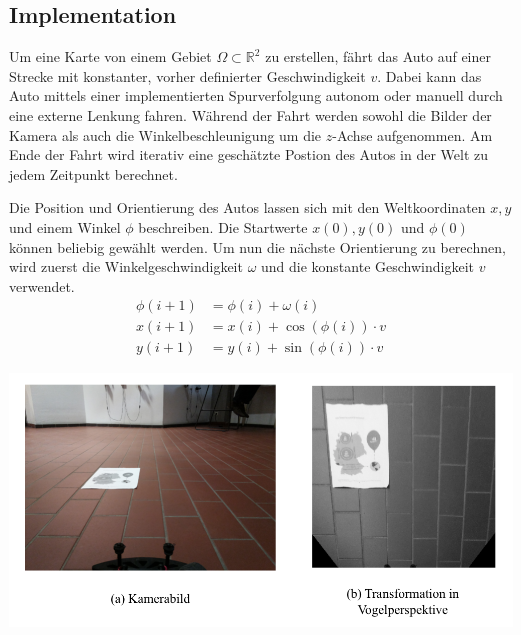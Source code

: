 \subsection{Implementation}

Um eine Karte von einem Gebiet $ \Omega \subset \mathbb{R}^2$ zu erstellen, fährt das Auto auf einer Strecke mit konstanter, vorher definierter Geschwindigkeit $v$. Dabei kann das Auto mittels einer implementierten Spurverfolgung autonom oder manuell durch eine externe Lenkung fahren. 
Während der Fahrt werden sowohl die Bilder der Kamera 
als auch die Winkelbeschleunigung um die $z$-Achse 
aufgenommen. Am Ende der Fahrt wird iterativ eine geschätzte Postion des Autos in der Welt zu jedem Zeitpunkt berechnet.

Die Position und Orientierung des Autos lassen sich mit den Weltkoordinaten $x,y$ und einem Winkel $\phi$ beschreiben. Die Startwerte $x(0),y(0)$ und $\phi(0)$ können beliebig gewählt werden. Um nun die nächste Orientierung zu berechnen, wird zuerst die Winkelgeschwindigkeit $\omega$ und die konstante Geschwindigkeit $v$ verwendet.
$$
\begin{aligned}
\phi(i+1)&=\phi(i)+\omega(i)\\
x(i+1)&=x(i)+\cos(\phi(i))\cdot v\\
y(i+1)&=y(i)+\sin(\phi(i))\cdot v
\end{aligned}
$$

\hspace{-12mm}
\includegraphics[scale=1]{vogel.png}



